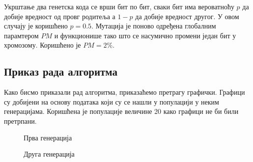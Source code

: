 \documentclass{article}
\begin{document}
Укрштање два генетска кода се врши бит по бит, сваки бит има вероватноћу  $p$
да добије вредност од провг родитеља а $1 - p$ да добије вредност другог. У овом
случају је коришћено $p = 0.5$. Мутација је поново одређена глобалним парамтером $PM$ 
и функционише тако што се насумично промени један бит у хромозому. Коришћено је 
$PM = 2\%$.


\subsection{Приказ рада алгоритма}
Како бисмо приказали рад алгоритма, приказаћемо претрагу графички. Графици су добијени на основу података
који су се нашли у популацији у неким генерацијама. Коришћена је популације величине 20 како графици
не би били претрпани.

\begin{figure}[H]
    \centering

    \caption{Прва генерација}
\end{figure}

\begin{figure}[H]
    \centering

    \caption{Друга генерација}
\end{figure}
\end{document}
